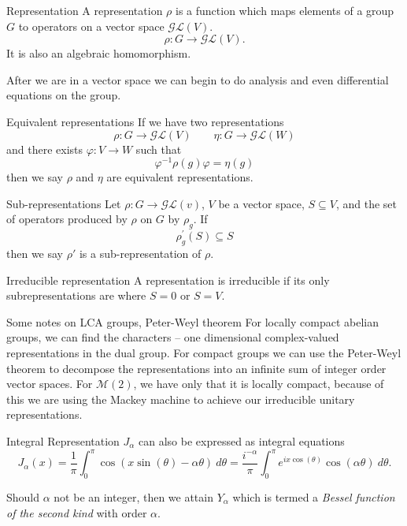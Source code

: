 \documentclass{article}
\begin{document}
\begin{Define}{Representation}
    A representation $\rho$ is a function which maps elements of a group $G$ to operators on a vector space $\mathcal{GL}(V)$. \[ \rho : G \rightarrow \mathcal{GL}(V) .\]
    It is also an algebraic homomorphism. 
\end{Define}
After we are in a vector space we can begin to do analysis and even differential equations on the group.\par

\begin{Define}{Equivalent representations}
    If we have two representations
    \[%
        \rho : G \rightarrow \mathcal{GL}(V) 
        \qquad
        \eta : G \rightarrow \mathcal{GL}(W)
    \]%
    and there exists $\varphi : V \rightarrow W$ such that 
    \[%
        \varphi^{-1} \rho(g) \varphi = \eta(g)
    \]%
    then we say $\rho$ and $\eta$ are equivalent representations.
\end{Define}

\begin{Define}{Sub-representations}
    Let $\rho : G \rightarrow \mathcal{GL}(v)$, $V$ be a vector space, $S \subseteq V$, and the set of operators produced by $\rho$ on $G$ by $\rho_{g}$. If 
    \[%
        \rho^{'}_{g}(S) \subseteq S
    \]%
    then we say $\rho'$ is a sub-representation of $\rho$.
\end{Define}

\begin{Define}{Irreducible representation}
    A representation is irreducible if its only subrepresentations are where $S=0$ or $S=V$.
\end{Define}

%    

\begin{Remark}{Some notes on LCA groups, Peter-Weyl theorem}
    For locally compact abelian groups, we can find the characters -- one dimensional complex-valued representations in the dual group. For compact groups we can use the Peter-Weyl theorem to decompose the representations into an infinite sum of integer order vector spaces. For $\mathcal{M}(2)$, we have only that it is locally compact, because of this we are using the Mackey machine to achieve our irreducible unitary representations. 
\end{Remark}

\begin{Define}{Integral Representation}
    \label{sec:bessel_integral}
    $J_{\alpha}$ can also be expressed as integral equations
    \[ J_\alpha(x) = \frac{1}{\pi} \int^{\pi}_{0} \cos\left(x \sin\left(\theta\right) - \alpha\theta\right)  \ d\theta = \frac{i^{-\alpha}}{\pi} \int^{\pi}_{0} e^{ix \cos\left(\theta\right)} \cos\left(\alpha\theta\right) \ d\theta .\] 
    \par
\end{Define}
Should $\alpha$ not be an integer, then we attain $Y_{\alpha}$ which is termed a \textit{Bessel function of the second kind} with order $\alpha$.
\end{document}
